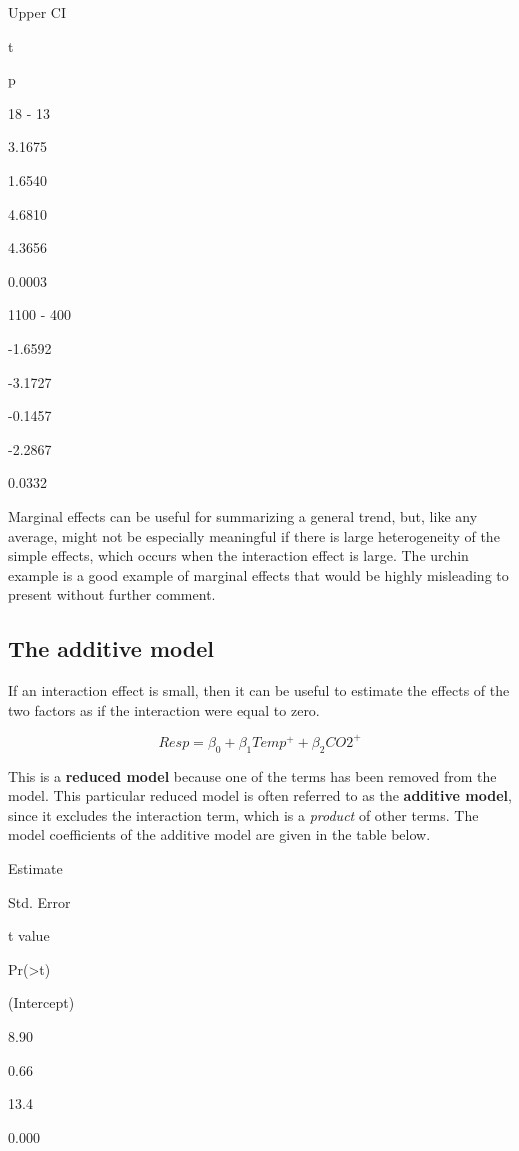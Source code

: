 \documentclass[]{book}
\begin{document}
Upper CI

t

p

18 - 13

3.1675

1.6540

4.6810

4.3656

0.0003

1100 - 400

-1.6592

-3.1727

-0.1457

-2.2867

0.0332

Marginal effects can be useful for summarizing a general trend, but, like any average, might not be especially meaningful if there is large heterogeneity of the simple effects, which occurs when the interaction effect is large. The urchin example is a good example of marginal effects that would be highly misleading to present without further comment.

\hypertarget{the-additive-model}{%
\subsection{The additive model}\label{the-additive-model}}

If an interaction effect is small, then it can be useful to estimate the effects of the two factors as if the interaction were equal to zero.

\begin{equation}
Resp = \beta_0 + \beta_1Temp^+ + \beta_2CO2^+
\end{equation}

This is a \textbf{reduced model} because one of the terms has been removed from the model. This particular reduced model is often referred to as the \textbf{additive model}, since it excludes the interaction term, which is a \emph{product} of other terms. The model coefficients of the additive model are given in the table below.

Estimate

Std. Error

t value

Pr(\textgreater\textbar t\textbar)

(Intercept)

8.90

0.66

13.4

0.000
\end{document}
